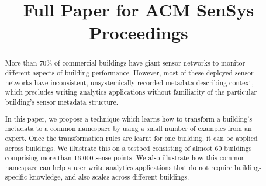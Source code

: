 \documentclass[10pt,preprint]{sensys-proc}
\author{
%
}
\title{Full Paper for ACM SenSys Proceedings}
\begin{document}
\maketitle

\begin{abstract}
More than 70\% of commercial buildings have giant sensor networks to monitor 
different aspects of building performance. However, most of these deployed sensor networks 
have inconsistent, unsystemically recorded metadata describing context, which precludes 
writing analytics applications 
without familiarity of the particular building's sensor metadata structure. 

In this paper, we propose a technique which learns how to transform a building's 
metadata to a common namespace by using a small number of examples from an expert. Once 
the transformation rules are learnt for one building, it can be applied across buildings.
We illustrate this on a testbed consisting of almost
60 buildings comprising more than 16,000 sense points. We also illustrate how this 
common namespace can help a user write analytics applications that do not require
building-specific knowledge, and also scales across different buildings. 
\end{abstract}







%

%




\end{document}
